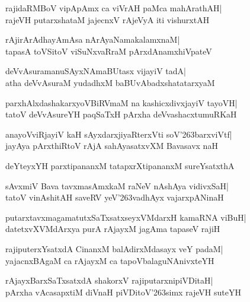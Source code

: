 \documentclass[twoside,12pt,openright]{book}
\def\S{\char'263}
\newcounter{shloka}[chapter]
\begin{document}
\begin{shloka}%
rajidaRMBoV vipApAmx ca viVrAH paMca mahArathAH|\\
rajeVH putarxshataM jajecnxV rAjeVyA iti vishurxtAH
\end{shloka}

\begin{shloka}%
rAjirArAdhayAmAsa nArAyaNamakalamxnaM|\\
tapasA toVSitoV viSuNxvaRraM pArxdAnamxhiVpateV
\end{shloka}

\begin{shloka}%
deVvAsuramanuSAyxNAmaBUtasx vijayiV tadA|\\
atha deVvAsuraM yudadhxM baBUvAbadxshatatarxyaM
\end{shloka}

\begin{shloka}%
parxhAlxdashakarxyoVBiRVmaM na kashicxdivxjayiV tayoVH|\\
tatoV deVvAsureYH paqSaTxH pArxha deVvashacxtumuRKaH
\end{shloka}

\begin{shloka}%
anayoVviRjayiV kaH sAyxdarxjiyaRterxVti soV\S barxviVtf|\\
jayAya pArxthiRtoV rAjA sahAyasatxvXM Bavasavx naH
\end{shloka}

\begin{shloka}%
deYteyxYH parxtipananxM tatapxrXtipananxM sureYsatxthA
\end{shloka}

\begin{shloka}%
sAvxmiV Bava tavxmasAmxkaM raNeV nAshAya vidivxSaH|\\
tatoV vinAshitAH saveRV yeV\S vadhAyx vajarxpANinaH
\end{shloka}

\begin{shloka}%
putarxtavxmagamatutxSaTxsatxseyxVMdarxH kamaRNA viBuH|\\
datetxvXVMdArxya purA rAjayxM jagAma tapaseV rajiH
\end{shloka}

\begin{shloka}%
rajiputerxYsatxdA CinanxM balAdirxMdasayx veY padaM|\\
yajacnxBAgaM ca rAjayxM ca tapoVbalaguNAnivxteYH
\end{shloka}

\begin{shloka}%
rAjayxBarxSaTxsatxdA shakorxV rajiputarxnipiVDitaH|\\
pArxha vAcasapxtiM diVnaH piVDitoV\S simx rajeVH suteYH
\end{shloka}
\end{document}
